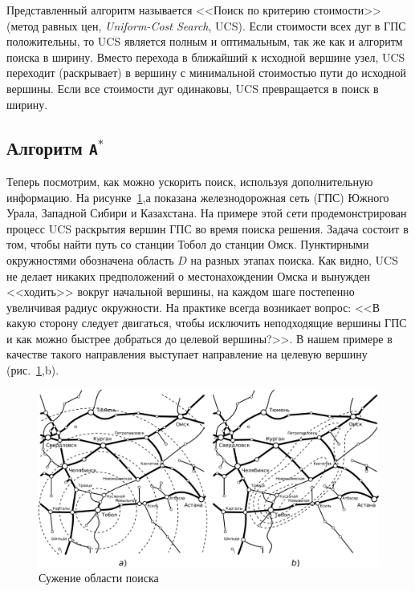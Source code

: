 \documentclass[a4paper,14pt, openany, twoside, draft]{extbook} %
\newcommand{\eeng}[1]{\emph{\foreignlanguage{english}{#1}}}
\begin{document}
Представленный алгоритм называется <<Поиск по критерию стоимости>> (метод равных цен, \eeng{Uniform-Cost Search}, UCS).  Если стоимости всех дуг в ГПС положительны, то UCS является полным и оптимальным, так же как и алгоритм поиска в ширину.  Вместо перехода в ближайший к исходной вершине узел, UCS переходит (раскрывает) в вершину с минимальной стоимостью пути до исходной вершины.  Если все стоимости дуг одинаковы, UCS превращается в поиск в ширину.

\subsection{Алгоритм \texttt{A}${}^\mathtt{*}$}

Теперь посмотрим, как можно ускорить поиск, используя дополнительную информацию.  На рисунке~\ref{fig:contraction},а показана железнодорожная сеть (ГПС) Южного Урала, Западной Сибири и Казахстана.  На примере этой сети продемонстрирован процесс UCS раскрытия вершин ГПС во время поиска решения.  Задача состоит в том, чтобы найти путь со станции Тобол до станции Омск.   Пунктирными окружностями обозначена область $D$ на разных этапах поиска.  Как видно, UCS не делает никаких предположений о местонахождении Омска и вынужден <<ходить>> вокруг начальной вершины, на каждом шаге постепенно увеличивая радиус окружности.  На практике всегда возникает вопрос: <<В какую сторону следует двигаться, чтобы исключить неподходящие вершины ГПС и как можно быстрее добраться до целевой вершины?>>.  В нашем примере в качестве такого направления выступает направление на целевую вершину (рис.~\ref{fig:contraction},b).
\begin{figure}[hbt]
  \centering
  \includegraphics[width=\columnwidth]{yuzd1.pdf}
  \caption{Сужение области поиска}\label{fig:contraction}
\end{figure}
\end{document}
